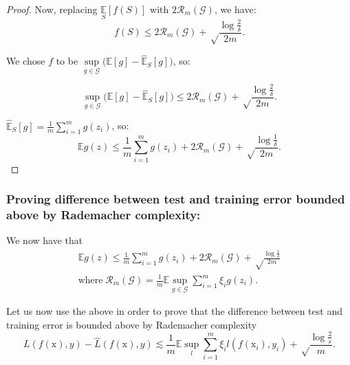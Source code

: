 \documentclass[twoside]{article}
\theoremstyle{definition}
\theoremstyle{definition}
\theoremstyle{remark}
\begin{document}
\begin{proof}
Now, replacing $\underset{S}{\mathbb{E}} [f(S)]$ with $2 \mathcal{R}_m(\mathcal{G})$, we have:
\[
f(S) \leq 2 \mathcal{R}_m(\mathcal{G}) + \sqrt \frac{\log \frac{2}{\delta}}{2m}.
\]

We chose $f$ to be $\sup \limits_{g\in\mathcal{G}} \bigg( \mathbb{E}[g] - \hat{\mathbb{E}}_S[g] \bigg)$, so:

\[
\sup \limits_{g\in\mathcal{G}} \bigg( \mathbb{E}[g] - \hat{\mathbb{E}}_S[g] \bigg) \leq 2 \mathcal{R}_m(\mathcal{G}) + \sqrt \frac{\log \frac{2}{\delta}}{2m}.
\]

$\hat{\mathbb{E}}_S[g] = \frac{1}{m} \sum \limits_{i=1}^m g(z_i)$, so:
\[
\mathbb{E} g(z) \leq \frac{1}{m} \sum \limits_{i=1}^m g(z_i) + 2 \mathcal{R}_m(\mathcal{G}) + \sqrt\frac{\log \frac{1}{\delta}}{2m}.
\]

\end{proof}

\subsubsection*{Proving difference between test and training error bounded above by Rademacher complexity:}

We now have that
\[
\begin{aligned}
\mathbb{E} g(z) \leq \frac{1}{m} \sum \limits_{i=1}^m g(z_i) + 2 \mathcal{R}_m(\mathcal{G}) + \sqrt\frac{\log \frac{1}{\delta}}{2m} \\
\text{where} \; \mathcal{R}_m(\mathcal{G}) = \frac{1}{m} \mathbb{E} \sup \limits_{g\in\mathcal{G}} \sum \limits_{i=1}^m \xi_i g(z_i).
\end{aligned}
\]

Let us now use the above in order to prove that the difference between test and training error is bounded above by Rademacher complexity
\[
L(f(\text{x}),y) - \hat L(f(\text{x}),y) \lesssim \frac{1}{m} \mathbb{E} \sup \limits_l \sum\limits_{i=1}^m \xi_i l(f(\text{x}_i),y_i) + \sqrt\frac{\log \frac{2}{s}}{m}.
\]
\end{document}
